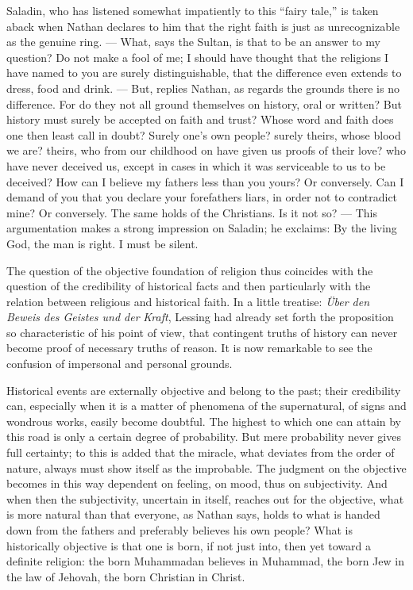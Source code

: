 \documentclass[12pt,a4paper,openany]{book}
\newcommand{\opage}[1]{\marginnote{\footnotesize\textit{[#1]}}}
\begin{document}
Saladin, who has listened somewhat impatiently to this
``fairy tale,'' is taken aback when Nathan declares to him that the right
faith is just as unrecognizable as the genuine ring. --- What,
says the Sultan, is that to be an answer to my question?
Do not make a fool of me; I should have thought that the
religions I have named to you are surely distinguishable,
that the difference even extends to dress, food
and drink. --- But, replies Nathan, as regards the grounds
there is no difference. For do they not all
ground themselves on history, oral or written? But history
must surely be accepted on faith and trust? Whose word and
faith does one then least call in doubt? Surely one's own people?
surely theirs, whose blood we are? theirs, who from our
childhood on have given us proofs of their love?
who have never deceived us, except in cases in which it
was serviceable to us to be deceived? How can I believe
my fathers less than you yours? Or conversely. Can
I demand of you that you declare your forefathers
liars, in order not to contradict mine? Or conversely.
The same holds of the Christians. Is it not so? ---
This argumentation makes a strong impression on Saladin;
he exclaims: By the living God, the man
is right. I must be silent.

\setcounter{footnote}{0}%
\opage{610}The question of the objective foundation of religion
thus coincides with the question of the credibility of historical
facts and then particularly with the relation
between religious and historical faith. In a little treatise:
\emph{Über den Beweis des Geistes und der}
\emph{Kraft}, Lessing had already set forth the proposition so characteristic of his
point of view, that contingent
truths of history can never become proof of necessary
truths of reason. It is now remarkable to see
the confusion of impersonal and personal grounds.

Historical events are externally objective
and belong to the past; their credibility can,
especially when it is a matter of phenomena of the supernatural,
of signs and wondrous works, easily become doubtful.
The highest to which one can attain by this road
is only a certain degree of probability. But mere
probability never gives full certainty; to this is added
that the miracle, what deviates from the order of nature, always
must show itself as the improbable. The judgment on
the objective becomes in this way dependent on feeling,
on mood, thus on subjectivity. And when then
the subjectivity, uncertain in itself, reaches out for the objective,
what is more natural than that everyone, as Nathan
says, holds to what is handed down from the fathers and preferably
believes his own people? What is historically objective is that one is
born, if not just into, then yet toward a definite religion:
the born Muhammadan believes in Muhammad, the
born Jew in the law of Jehovah, the born Christian in Christ.
\end{document}
